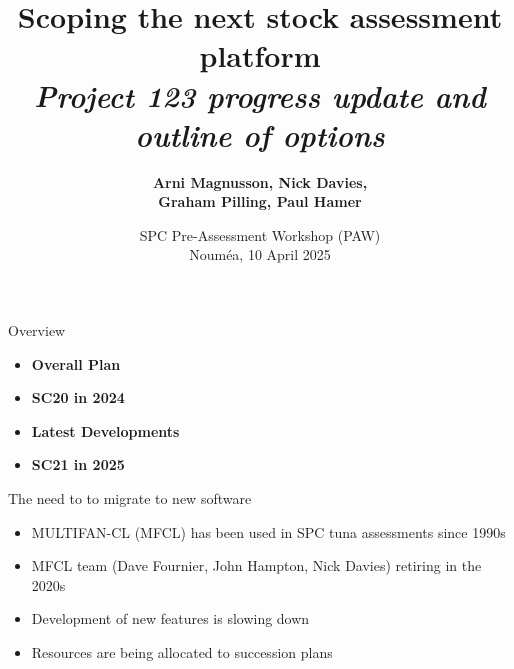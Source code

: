 \documentclass[aspectratio=169,fleqn]{beamer}
\begin{document}
\begin{frame}
  \title{\vspace{-5ex}\darkblue Scoping the next stock assessment
    platform\\[2ex]
    \it\large\darkgray
    Project 123 progress update and outline of options}
  \author{\vspace{-10ex}\darkgray\bf
    Arni Magnusson, Nick Davies,\\[0.5ex]
    Graham Pilling, Paul Hamer}
  \date{\darkgreen SPC Pre-Assessment Workshop (PAW)\\[0.5ex]
    Nouméa, 10 April 2025}
  \titlepage
\end{frame}


\begin{frame}{Overview}
  \begin{itemize}
    \item[] {\bf\darkblue Overall Plan} \\[5ex]
    \item[] {\bf\darkblue SC20 in 2024} \\[5ex]
    \item[] {\bf\darkblue Latest Developments} \\[5ex]
    \item[] {\bf\darkblue SC21 in 2025} \\[1ex]
  \end{itemize}
\end{frame}


\begin{frame}{The need to to migrate to new software}
  \begin{itemize}
    \item[] MULTIFAN-CL (MFCL) has been used in SPC tuna assessments since
    1990s\\[4ex]
    \item[] MFCL team (Dave Fournier, John Hampton, Nick Davies) retiring in the
    2020s\\[4ex]
    \item[] Development of new features is slowing down\\[4ex]
    \item[] Resources are being allocated to succession plans\\[2ex]
  \end{itemize}
\end{frame}
\end{document}
